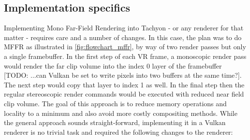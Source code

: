 \subsection{Implementation specifics}
Implementing Mono Far-Field Rendering into Tachyon - or any renderer for that matter - requires care and a number of changes. In this case, the plan was to do MFFR as illustrated in \autoref{fig:flowchart_mffr}, by way of two render passes but only a single framebuffer. In the first step of each VR frame, a monoscopic render pass would render the far clip volume into the index 0 layer of the framebuffer [TODO: ...can Vulkan be set to write pixels into two buffers at the same time?]. The next step would copy that layer to index 1 as well. In the final step then the regular stereoscopic render commands would be executed with reduced near field clip volume. The goal of this approach is to reduce memory operations and locality to a minimum and also avoid more costly compositing methods. While the general approach sounds straight-forward, implementing it in a Vulkan renderer is no trivial task and required the following changes to the renderer: 
